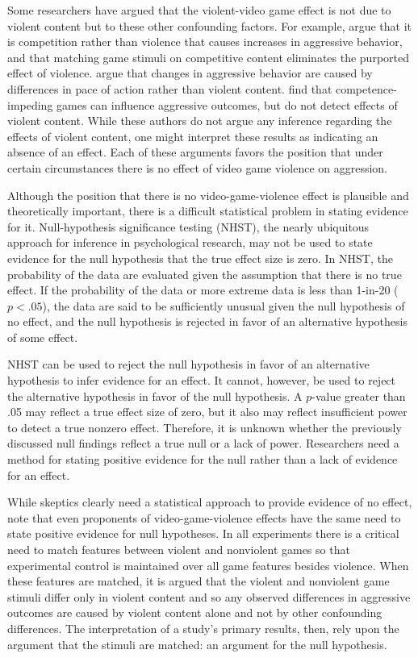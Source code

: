 \documentclass[man]{apa6}
\begin{document}
Some researchers have argued that the violent-video game effect is not due to violent content but to these other confounding factors.  For example, \citet{Adachi:Willoughby:2011} argue that it is competition rather than violence that causes increases in aggressive behavior, and that matching game stimuli on competitive content eliminates the purported effect of violence. \citet{Elson:etal:2013} argue that changes in aggressive behavior are caused by differences in pace of action rather than violent content.  \citet{Przybylski:etal:2014} find that competence-impeding games can influence aggressive outcomes, but do not detect effects of violent content. While these authors do not argue any inference regarding the effects of violent content, one might interpret these results as indicating an absence of an effect. Each of these arguments favors the position that under certain circumstances there is no effect of video game violence on aggression.  

Although the position that there is no video-game-violence effect is plausible and theoretically important, there is a difficult statistical problem in stating evidence for it. Null-hypothesis significance testing (NHST), the nearly ubiquitous approach for inference in psychological research, may not be used to state evidence for the null hypothesis that the true effect size is zero.  In NHST, the probability of the data are evaluated given the assumption that there is no true effect. If the probability of the data or more extreme data is less than 1-in-20 ($p<.05$), the data are said to be sufficiently unusual given the null hypothesis of no effect, and the null hypothesis is rejected in favor of an alternative hypothesis of some effect.

NHST can be used to reject the null hypothesis in favor of an alternative hypothesis to infer evidence for an effect.  It cannot, however, be used to  reject the alternative hypothesis in favor of the null hypothesis. A $p$-value greater than .05 may reflect a true effect size of zero, but it also may reflect insufficient power to detect a true nonzero effect. Therefore, it is unknown whether the previously discussed null findings reflect a true null or a lack of power.  Researchers need a method for stating positive evidence for the null rather than a lack of evidence for an effect.

While skeptics clearly need a statistical approach to provide evidence of no effect, note that even proponents of video-game-violence effects have the same need to state positive evidence for null hypotheses.  In all experiments there is a critical need to match features between violent and nonviolent games so that experimental control is maintained over all game features besides violence.  When these features are matched, it is argued that the violent and nonviolent game stimuli differ only in violent content and so any observed differences in aggressive outcomes are caused by violent content alone and not by other confounding differences.  The interpretation of a study's primary results, then, rely upon the argument that the stimuli are matched: an argument for the null hypothesis.  
\end{document}
